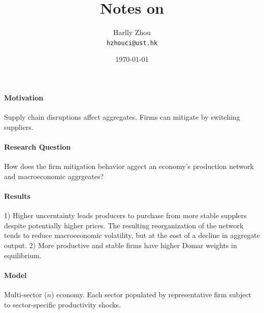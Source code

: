 \documentclass[12pt]{article}
\title{Notes on \cite{kopytovEndogenousProductionNetworks2024}}
\author{Harlly Zhou \\ \texttt{hzhouci@ust.hk}}
\date{\today}
\numberwithin{equation}{section}
\begin{document}
\maketitle

\paragraph{Motivation} Supply chain disruptions affect aggregates. Firms can mitigate by switching suppliers.

\paragraph{Research Question} How does the firm mitigation behavior aggect an economy's production network and macroeconomic aggrgeates?

\paragraph{Results} 1) Higher uncerntainty leads producers to purchase from more stable supplers despite potentially higher prices. The resulting reorganization of the network tends to reduce macroeconomic volatility, but at the cost of a decline in aggregate output. 2) More productive and stable firms have higher Domar weights in equilibrium.
\paragraph{Model} Multi-sector ($n$) economy. Each sector populated by representative firm subject to sector-specific productivity shocks. 
\end{document}
